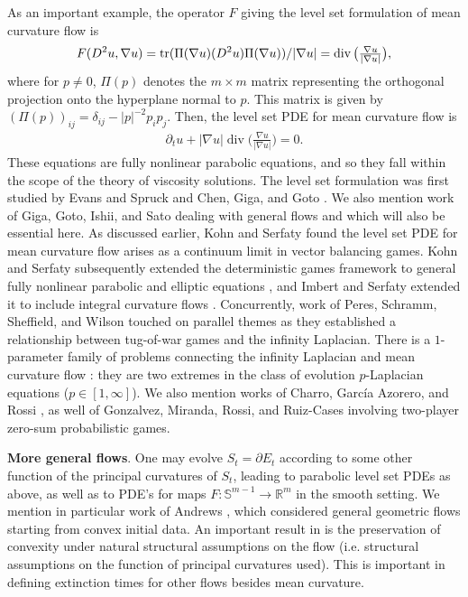 \documentclass[reqno]{amsart}
\numberwithin{equation}{section}
\DeclareMathOperator{\dive}{div}
\DeclareMathOperator{\tr}{\mathrm\mathrm{tr}}
\begin{document}
As an important example, the operator $F$ giving the level set formulation of mean curvature flow is
\begin{align*}
  F(D^2u,\nabla u) = \tr(\Pi(\nabla u)(D^2u)\Pi(\nabla u))/|\nabla u| = \dive\big( \tfrac{\nabla u}{|\nabla u|}\big),
\end{align*}
where for $p\neq 0$,  $\Pi(p)$  denotes the $m\times m$ matrix representing the orthogonal projection onto the hyperplane normal to $p$. This matrix is given by $(\Pi(p))_{ij} = \delta_{ij}-|p|^{-2}p_ip_j$. Then, the level set PDE for mean curvature flow is 
 \begin{align*}
   \partial_t u + |\nabla u|\dive\big(\tfrac{\nabla u}{|\nabla u|}\big) = 0.
 \end{align*} 
These equations are fully nonlinear parabolic equations, and so they fall within the scope of the theory of viscosity solutions. The level set formulation was first studied by Evans and Spruck \cite{EvansSpruck1991} and Chen, Giga, and Goto \cite{ChenGigaGoto1989}. We also mention work of Giga, Goto, Ishii, and Sato \cite{GigaGotoIshiiSato1991} dealing with general flows and which will also be essential here. As discussed  earlier, Kohn and Serfaty \cite{KohnSerfaty2006} found the level set PDE for mean curvature flow arises as a continuum limit in vector balancing games. Kohn and Serfaty  subsequently extended the deterministic games framework to general fully nonlinear parabolic and elliptic equations \cite{kohn2010}, and Imbert and Serfaty extended it to include integral curvature flows \cite{IS11}. Concurrently, work of Peres, Schramm, Sheffield, and Wilson \cite{peres2009tug} touched on parallel themes as they established a relationship between tug-of-war games and the infinity Laplacian. There is a $1$-parameter family of problems connecting the infinity Laplacian \cite{peres2009tug} and mean curvature flow \cite{KohnSerfaty2006}: they are two extremes in the class of evolution $p$-Laplacian equations ($p\in [1,\infty]$). We also mention works of Charro, Garc\'ia Azorero, and Rossi \cite{charro2009mixed}, as well of Gonzalvez, Miranda, Rossi, and  Ruiz-Cases \cite{GMRR26} involving two-player zero-sum probabilistic games.

  \textbf{More general flows}. One may evolve $S_t = \partial E_t$  according to some other function of the principal curvatures of $S_t$, leading to parabolic level set PDEs as above, as well as to PDE's for maps $F:\mathbb{S}^{m-1}\to\mathbb{R}^m$ in the smooth setting.  We mention in particular work of Andrews \cite{andrews1994contraction}, which considered general geometric flows starting from convex initial data. An important result in \cite{andrews1994contraction} is the preservation of convexity under natural structural assumptions on the flow (i.e. structural assumptions on the function of principal curvatures used). This is important in defining extinction times for other flows besides mean curvature. 
  
\end{document}

